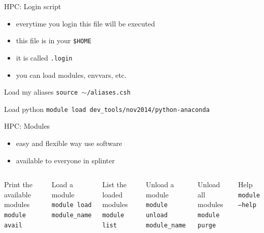 \documentclass{beamer}
\begin{document}
\begin{frame}{HPC: Login script}
	\begin{itemize}
		\item everytime you login this file will be executed
		\item this file is in your \texttt{\$HOME}
		\item it is called \texttt{.login}
		\item you can load modules, envvars, etc.
	\end{itemize}
	\begin{Examples}
		\begin{block}{Load my aliases}
		    \texttt{source $\sim$/aliases.csh}
                \end{block}
                \begin{block}{Load python}
                     \texttt{module load dev\_tools/nov2014/python-anaconda}
                \end{block}
	\end{Examples}
\end{frame}

\begin{frame}{HPC: Modules}
	\begin{itemize}
		\item easy and flexible way use software
		\item available to everyone in splinter
	\end{itemize}
	
	\begin{Examples}
	    \begin{columns}
		\begin{block}{Print the available modules}
			\texttt{module avail}
		\end{block}
		\begin{block}{Load a module}
			\texttt{module load module\_name}
		\end{block}
		\begin{block}{List the loaded modules}
			\texttt{module list}
		\end{block}
	
	        \column{.5\textwidth}
		\begin{block}{Unload a module}
			\texttt{module unload module\_name}
		\end{block}
		\begin{block}{Unload all modules}
			\texttt{module purge}
		\end{block}		
		\begin{block}{Help}
			\texttt{module --help}
		\end{block}	
	    \end{columns}								
	\end{Examples}
\end{frame}
\end{document}
